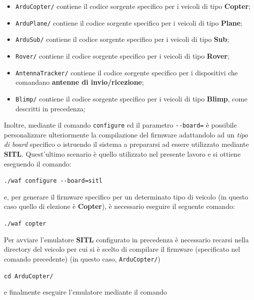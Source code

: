 \documentclass[a4paper, 12pt, oneside]{article}
\begin{document}
\begin{itemize}
    \item \texttt{ArduCopter/} contiene il codice sorgente specifico per i veicoli di tipo \textbf{Copter};
    \item \texttt{ArduPlane/} contiene il codice sorgente specifico per i veicoli di tipo \textbf{Plane};
    \item \texttt{ArduSub/} contiene il codice sorgente specifico per i veicoli di tipo \textbf{Sub};
    \item \texttt{Rover/} contiene il codice sorgente specifico per i veicoli di tipo \textbf{Rover};
    \item \texttt{AntennaTracker/} contiene il codice sorgente specifico per i dispositivi che comandano \textbf{antenne di invio/ricezione};
    \item \texttt{Blimp/} contiene il codice sorgente specifico per i veicoli di tipo \textbf{Blimp}, come descritti in precedenza;
\end{itemize}

Inoltre, mediante il comando \texttt{configure} ed il parametro \texttt{-{}-board=} è possibile personalizzare ulteriormente la compilazione del firmware adattandolo ad un \textit{tipo di board} specifico o istruendo il sistema a prepararsi ad essere utilizzato mediante \textbf{SITL}\cite{how-to-build-ardupilot}. Quest'ultimo scenario è quello utilizzato nel presente lavoro e si ottiene eseguendo il comando:

\begin{center}
    \texttt{./waf configure -{}-board=sitl}
\end{center}

e, per generare il firmware specifico per un determinato tipo di veicolo (in questo caso quello di elezione è \textbf{Copter}), è necessario eseguire il seguente comando:

\begin{center}
    \texttt{./waf copter}
\end{center}

Per avviare l'emulatore \textbf{SITL} configurato in precedenza è necessario recarsi nella directory del veicolo per cui si è scelto di compilare il firmware (specificato nel comando precedente) (in questo caso, \texttt{ArduCopter/})

\begin{center}
    \texttt{cd ArduCopter/}
\end{center}

e finalmente eseguire l'emulatore mediante il comando
\end{document}
